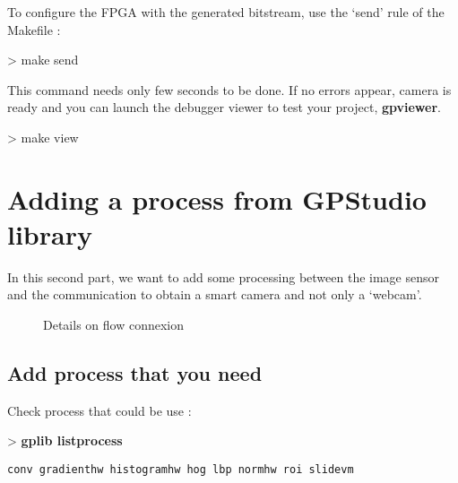 \documentclass[10pt,a4paper]{article}
\begin{document}
To configure the FPGA with the generated bitstream, use the `send' rule of the Makefile :

\begin{sample}
> make send
\end{sample}

This command needs only few seconds to be done. If no errors appear, camera is ready and you can launch the debugger viewer to test your project, \textbf{gpviewer}.

\begin{sample}
> make view
\end{sample}

\section{Adding a process from GPStudio library}
In this second part, we want to add some processing between the image sensor and the communication to obtain a smart camera and not only a `webcam'.

\begin{figure}[h!]
\centering
{}
\caption{Details on flow connexion}
\end{figure}

\subsection{Add process that you need}
Check process that could be use :

\begin{sampletitle}
> \textbf{gplib listprocess}
\begin{Verbatim}
conv gradienthw histogramhw hog lbp normhw roi slidevm
\end{Verbatim}
\end{sampletitle}
\end{document}
